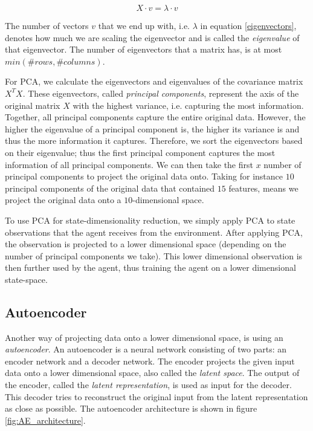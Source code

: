 \begin{equation}
\label{eigenvectors}
X \cdot v = \lambda \cdot v
\end{equation}

The number of vectors $v$ that we end up with, i.e. $\lambda$ in equation \ref{eigenvectors}, denotes how much we are scaling the eigenvector and is called the \emph{eigenvalue} of that eigenvector. The number of eigenvectors that a matrix has, is at most $min(\#rows, \#columns)$. 

For PCA, we calculate the eigenvectors and eigenvalues of the covariance matrix $X^TX$. These eigenvectors, called \emph{principal components}, represent the axis of the original matrix $X$ with the highest variance, i.e. capturing the most information. Together, all principal components capture the entire original data. However, the higher the eigenvalue of a principal component is, the higher its variance is and thus the more information it captures. Therefore, we sort the eigenvectors based on their eigenvalue; thus the first principal component captures the most information of all principal components. We can then take the first $x$ number of principal components to project the original data onto. Taking for instance $10$ principal components of the original data that contained $15$ features, means we project the original data onto a $10$-dimensional space.

To use PCA for state-dimensionality reduction, we simply apply PCA to state observations that the agent receives from the environment. After applying PCA, the observation is projected to a lower dimensional space (depending on the number of principal components we take). This lower dimensional observation is then further used by the agent, thus training the agent on a lower dimensional state-space.

\subsection{Autoencoder}\label{pl-ae}
Another way of projecting data onto a lower dimensional space, is using an \emph{autoencoder}\cite{AE_general}. An autoencoder is a neural network consisting of two parts: an encoder network and a decoder network. The encoder projects the given input data onto a lower dimensional space, also called the \emph{latent space}. The output of the encoder, called the \emph{latent representation}, is used as input for the decoder. This decoder tries to reconstruct the original input from the latent representation as close as possible. The autoencoder architecture is shown in figure \ref{fig:AE_architecture}.

